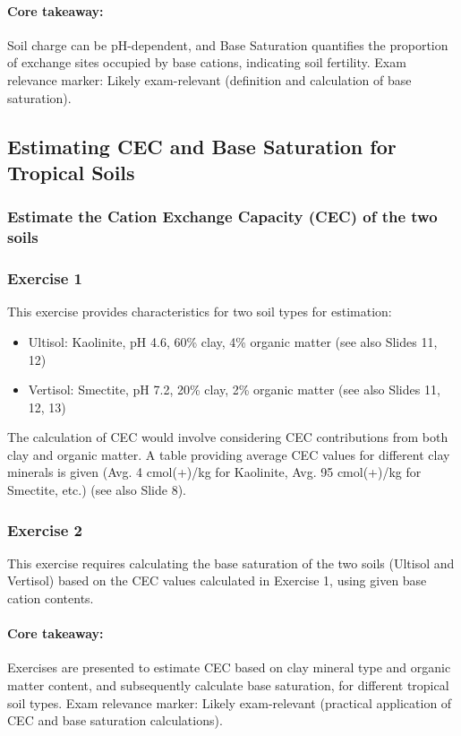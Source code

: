\paragraph*{Core takeaway:} 
Soil charge can be pH-dependent, and Base Saturation quantifies the proportion of exchange sites occupied by base cations, indicating soil fertility. Exam relevance marker: Likely exam-relevant (definition and calculation of base saturation).

\subsection{Estimating CEC and Base Saturation for Tropical Soils} 
\subsubsection*{Estimate the Cation Exchange Capacity (CEC) of the two soils} 
\subsubsection*{Exercise 1} 
This exercise provides characteristics for two soil types for estimation: 
\begin{itemize} 
    \item Ultisol: Kaolinite, pH 4.6, 60\% clay, 4\% organic matter (see also Slides 11, 12) 
    \item Vertisol: Smectite, pH 7.2, 20\% clay, 2\% organic matter (see also Slides 11, 12, 13) 
\end{itemize} 

The calculation of CEC would involve considering CEC contributions from both clay and organic matter. A table providing average CEC values for different clay minerals is given (Avg. 4 cmol(+)/kg for Kaolinite, Avg. 95 cmol(+)/kg for Smectite, etc.) (see also Slide 8).

\subsubsection*{Exercise 2} 
This exercise requires calculating the base saturation of the two soils (Ultisol and Vertisol) based on the CEC values calculated in Exercise 1, using given base cation contents.

\paragraph*{Core takeaway:} 
Exercises are presented to estimate CEC based on clay mineral type and organic matter content, and subsequently calculate base saturation, for different tropical soil types. Exam relevance marker: Likely exam-relevant (practical application of CEC and base saturation calculations).

